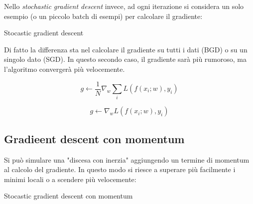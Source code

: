 Nello \textit{stochastic gradient descent} invece, ad ogni iterazione si considera un solo esempio (o un piccolo batch di esempi) per calcolare il gradiente:
\begin{algoritmo}{Stocastic gradient descent}
	\begin{algorithm}[H]
		\vskip3mm

	\end{algorithm}
\end{algoritmo}
Di fatto la differenza sta nel calcolare il gradiente su tutti i dati (BGD) o su un singolo dato (SGD). In questo secondo caso, il gradiente sarà più rumoroso, ma l'algoritmo convergerà più velocemente.
\vskip3mm
\begin{minipage}[t]{0.48\textwidth}
	\begin{center}
	\end{center}
	\[
		g \gets \frac{1}{N} \nabla_{w} \sum_i L(f(x_i; w), y_i)
	\]
\end{minipage}
%
\begin{minipage}[t]{0.48\textwidth}
	\begin{center}
	\end{center}
	\[
		g \gets \nabla_{w} L(f(x_i; w), y_i)
	\]
\end{minipage}
\subsection{Gradieent descent con momentum}
Si può simulare una "discesa con inerzia" aggiungendo un termine di momentum al calcolo del gradiente. In questo modo si riesce a superare più facilmente i minimi locali o a scendere più velocemente:
\begin{algoritmo}{Stocastic gradient descent con momentum}
	\begin{algorithm}[H]
		\vskip3mm

	\end{algorithm}
\end{algoritmo}


